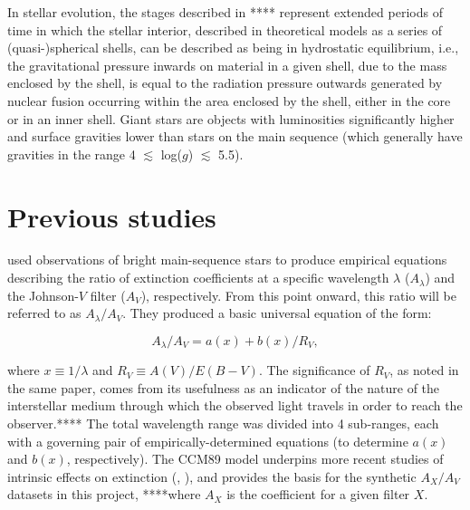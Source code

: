 \documentclass[12pt, a4paper]{report}
\begin{document}
In stellar evolution, the stages described in **** represent extended periods of time in which the stellar interior, described in theoretical models as a series of (quasi-)spherical shells, can be described as being in hydrostatic equilibrium, i.e., the gravitational pressure inwards on material in a given shell, due to the mass enclosed by the shell, is equal to the radiation pressure outwards generated by nuclear fusion occurring within the area enclosed by the shell, either in the core or in an inner shell. Giant stars are objects with luminosities significantly higher and surface gravities lower than stars on the main sequence (which generally have gravities in the range 4 $\lesssim$ log($g$) $\lesssim$ 5.5).

\section{Previous studies}
\cite{1989ApJ...345..245C} used observations of bright main-sequence stars to produce empirical equations describing the ratio of extinction coefficients at a specific wavelength $\lambda$ ($A_{\lambda}$) and the Johnson-$V$ filter ($A_{V}$), respectively. From this point onward, this ratio will be referred to as $A_{\lambda}/A_{V}$. They produced a basic universal equation of the form:


\begin{equation}
A_{\lambda}/A_{V} = a(x) + b(x)/R_{V},
\label{CCM_general}
\end{equation}

where $x \equiv 1/\lambda$ and $R_{V} \equiv A(V)/E(B-V)$. The significance of $R_{V}$, as noted in the same paper, comes from its usefulness as an indicator of the nature of the interstellar medium through which the observed light travels in order to reach the observer.**** The total wavelength range was divided into 4 sub-ranges, each with a governing pair of empirically-determined equations (to determine $a(x)$ and $b(x)$, respectively). The CCM89 model underpins more recent studies of intrinsic effects on extinction (\cite{2008PASP..120..583G}, \cite{2018MNRAS.479L.102C}), and provides the basis for the synthetic $A_{X}/A_{V}$ datasets in this project, ****where $A_{X}$ is the coefficient for a given filter $X$.
\end{document}
